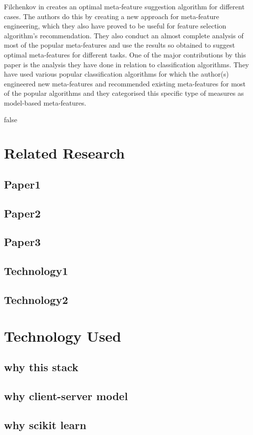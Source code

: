 Filchenkov in \citep{meta-features-2} creates an optimal meta-feature suggestion algorithm for different cases. The authors do this by creating a new approach for meta-feature engineering, which they also have proved to be useful for feature selection algorithm's recommendation. They also conduct an almost complete analysis of most of the popular meta-features and use the results so obtained to suggest optimal meta-features for different tasks. One of the major contributions by this paper is the analysis they have done in relation to classification algorithms. They have used various popular classification algorithms for which the author(s) engineered new meta-features and recommended existing meta-features for most of the popular algorithms and they categorised this specific type of measures as model-based meta-features.

\if false

\section{Related Research}

\subsection{Paper1}
\subsection{Paper2}
\subsection{Paper3}
\subsection{Technology1}
\subsection{Technology2}

\section{Technology Used}
\subsection{why this stack}
\subsection{why client-server model}
\subsection{why scikit learn}

\fi


